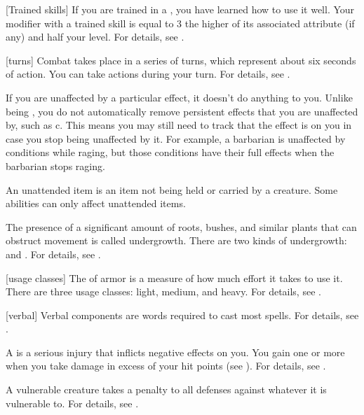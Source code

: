 
[Trained skills] If you are trained in a , you have learned how to use it well.
Your modifier with a trained skill is equal to 3 \add the higher of its associated attribute (if any) and half your level.
For details, see .

[turns] Combat takes place in a series of turns, which represent about six seconds of action.
You can take actions during your turn.
For details, see .

 If you are unaffected by a particular effect, it doesn't do anything to you.
Unlike being , you do not automatically remove persistent effects that you are unaffected by, such as c.
This means you may still need to track that the effect is on you in case you stop being unaffected by it.
For example, a barbarian is unaffected by conditions while raging, but those conditions have their full effects when the barbarian stops raging.

 An unattended item is an item not being held or carried by a creature.
Some abilities can only affect unattended items.

 The presence of a significant amount of roots, bushes, and similar plants that can obstruct movement is called undergrowth.
There are two kinds of undergrowth:  and .
For details, see .

[usage classes] The  of armor is a measure of how much effort it takes to use it.
There are three usage classes: light, medium, and heavy.
For details, see .

[verbal] Verbal components are words required to cast most spells.
For details, see .

 A  is a serious injury that inflicts negative effects on you.
You gain one or more  when you take damage in excess of your hit points (see ).
For details, see .

 A vulnerable creature takes a  penalty to all defenses against whatever it is vulnerable to.
For details, see .

